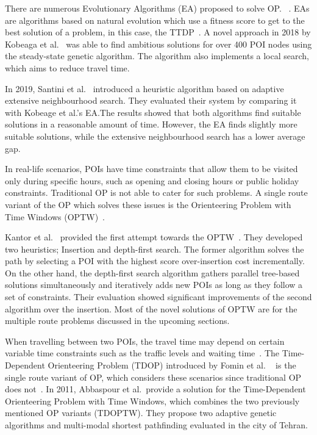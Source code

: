 There are numerous Evolutionary Algorithms (EA) proposed to solve OP.\@
~\cite{Kobeaga2018,Wang2008}. EAs are algorithms based on natural evolution which
use a fitness score to get to the best solution of a problem, in this case, the
TTDP~\cite{Gunawan2016}. A novel approach in 2018  by Kobeaga et al.~\cite{Kobeaga2018} was able
to find ambitious solutions for over 400 POI nodes using the steady-state
genetic algorithm. The algorithm also implements a local
search, which aims to reduce travel time. 

In 2019, Santini et al.~\cite{Santini2019} introduced a heuristic algorithm based on
adaptive extensive neighbourhood search. They evaluated their system by
comparing it with Kobeage et al.'s EA.\@ The results showed that both algorithms
find suitable solutions in a reasonable amount of time. However, the EA finds
slightly more suitable solutions, while the extensive neighbourhood search has
a lower average gap.

In real-life scenarios, POIs have time constraints that allow them to be
visited only during specific hours, such as opening and closing hours or public
holiday constraints. Traditional OP is not able to cater for such problems. A
single route variant of the OP which solves these issues is the Orienteering
Problem with Time Windows (OPTW)~\cite{Gavalas2014a}. 

Kantor et al.~\cite{Kantor1992} provided the first attempt towards the
OPTW~\cite{Vansteenwegen2011}. They developed two heuristics;
Insertion and depth-first search. The former algorithm solves the path by
selecting a POI with the highest score over-insertion cost incrementally. On
the other hand, the depth-first search algorithm gathers parallel tree-based
solutions simultaneously and iteratively adds new POIs as long as they follow a
set of constraints. Their evaluation showed significant improvements of the
second algorithm over the insertion. Most of the novel solutions of OPTW are
for the multiple route problems discussed in the upcoming sections. 

When travelling between two POIs, the travel time may depend on certain
variable time constraints such as the traffic levels and waiting time~\cite{Herzog2020}.
The Time-Dependent Orienteering Problem (TDOP) introduced by Fomin et al.
~\cite{Fomin2002} is the single route variant of OP, which considers
these scenarios since traditional OP does not~\cite{Gunawan2016}. In 2011, Abbaspour et
al.~\cite{Abbaspour2011}provide a solution for the
Time-Dependent Orienteering Problem with Time Windows, which combines the two
previously mentioned OP variants (TDOPTW).  They propose two adaptive genetic
algorithms and multi-modal shortest pathfinding evaluated in the city of
Tehran.

